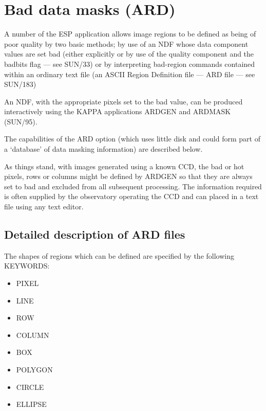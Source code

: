 \documentclass[twoside,11pt]{article}
\newcommand{\xref}[3]{#1}
\begin{document}
\newpage

\section{Bad data masks (ARD)}
\label{app:bad}

A number of the ESP application allows image regions to be defined as being of
poor quality by two basic methods; by use of an NDF whose data component      
values are set bad (either explicitly or by use of the quality component
and the badbits flag --- see \xref{SUN/33}{sun33}{}) or by interpreting bad-region
commands contained within an ordinary text file (an ASCII Region Definition file
--- ARD file --- see \xref{SUN/183}{sun183}{})

An NDF, with the appropriate pixels set to the bad value, can be produced 
interactively using the \xref{KAPPA}{sun95}{} applications ARDGEN and ARDMASK 
(\xref{SUN/95}{sun95}{}). 

The capabilities of the ARD option (which uses little disk
and could form part of a `database' of data masking information) 
are described below. 

As things stand, with images generated using a known CCD, the bad or hot 
pixels, rows or columns might be
defined by ARDGEN so that they are always set to bad and excluded from all 
subsequent processing. The information required is often supplied by the 
observatory operating the CCD and can placed in a text file using 
any text editor. 

\subsection{Detailed description of ARD files}

The shapes of regions which can be defined are specified by the
following KEYWORDS:
\begin{itemize}
\item PIXEL
\item LINE
\item ROW
\item COLUMN
\item BOX
\item POLYGON
\item CIRCLE
\item ELLIPSE
\end{itemize}
\end{document}
